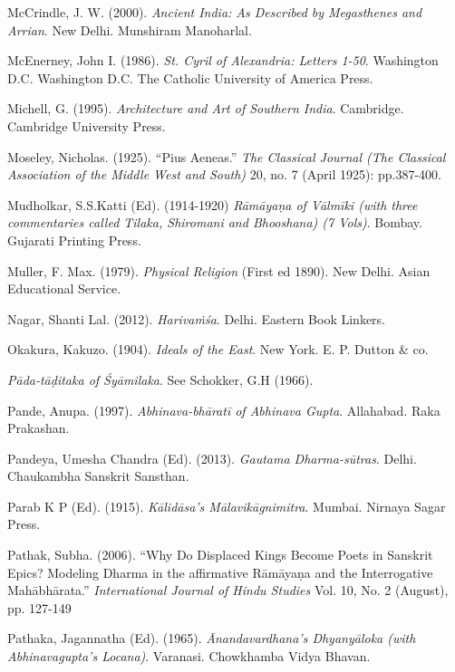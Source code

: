 \begin{thebibliography}{99}
McCrindle, J. W. (2000). {\sl Ancient India: As Described by Megasthenes and Arrian}. New Delhi. Munshiram Manoharlal. 

McEnerney, John I. (1986). {\sl St. Cyril of Alexandria: Letters 1-50}. Washington D.C.  Washington D.C. The Catholic University of America Press. 

Michell, G. (1995). {\sl Architecture and Art of Southern India}. Cambridge. Cambridge University Press.

Moseley, Nicholas. (1925). “Pius Aeneas.” {\sl The Classical Journal (The Classical Association of the Middle West and South)} 20, no. 7 (April 1925): pp.387-400.

Mudholkar, S.S.Katti (Ed). (1914-1920) {\sl Rāmāyaṇa of Vālmīki (with three commentaries called Tilaka,    Shiromani and Bhooshana) (7 Vols)}. Bombay. Gujarati Printing Press. 

Muller, F. Max. (1979). {\sl Physical Religion} (First ed 1890). New Delhi. Asian Educational Service. 

Nagar, Shanti Lal. (2012). {\sl Harivaṁśa}. Delhi. Eastern Book Linkers. 

Okakura, Kakuzo. (1904). {\sl Ideals of the East}. New York. E. P. Dutton \& co. 

{\sl Pāda-tāḍitaka of Śyāmilaka}. See Schokker, G.H (1966).

Pande, Anupa. (1997). {\sl Abhinava-bhāratī of Abhinava Gupta}. Allahabad. Raka Prakashan. 

Pandeya, Umesha Chandra (Ed). (2013). {\sl Gautama Dharma-sūtras}. Delhi. Chaukambha Sanskrit Sansthan. 

Parab K P (Ed). (1915). {\sl Kālidāsa’s Mālavikāgnimitra}. Mumbai. Nirnaya Sagar Press. 

Pathak, Subha. (2006). “Why Do Displaced Kings Become Poets in Sanskrit Epics? Modeling Dharma in the affirmative Rāmāyaṇa and the Interrogative Mahābhārata.” {\sl International Journal of Hindu Studies} Vol. 10, No. 2 (August), pp. 127-149

Pathaka, Jagannatha (Ed). (1965). {\sl Ānandavardhana’s Dhyanyāloka (with Abhinavagupta’s Locana)}. Varanasi. Chowkhamba Vidya Bhavan. 


\end{thebibliography}
